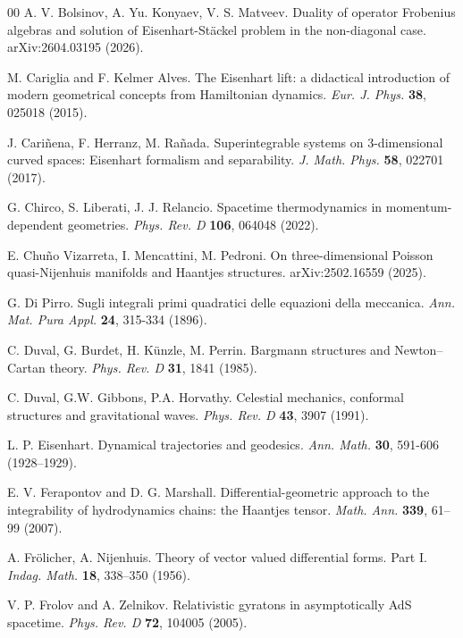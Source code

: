 \documentclass[10pt]{amsart}
\numberwithin{equation}{section}
\newcommand{\tbf}{\textbf}
\theoremstyle{definition}
\begin{document}
\begin{thebibliography}{00}
		 A. V. Bolsinov, A. Yu. Konyaev, V. S. Matveev. Duality of operator Frobenius algebras and solution of Eisenhart-St\"ackel problem in the non-diagonal case. arXiv:2604.03195 (2026).

		 M. Cariglia and F. Kelmer Alves. The Eisenhart lift: a didactical introduction of modern geometrical concepts from Hamiltonian dynamics. \textit{Eur. J. Phys.} \tbf{38}, 025018 (2015).
		
		 J. Cari{\~n}ena, F. Herranz, M. Ra{\~n}ada. Superintegrable systems on 3-dimensional curved spaces: Eisenhart formalism and separability.\textit{ J. Math. Phys.} \textbf{58}, 022701 (2017).
		
		 G. Chirco, S. Liberati, J. J. Relancio. Spacetime thermodynamics in momentum-dependent geometries. \textit{Phys. Rev. D} \tbf{106}, 064048 (2022).
		
		 E. Chuño Vizarreta, I. Mencattini, M. Pedroni. On three-dimensional Poisson quasi-Nijenhuis manifolds and Haantjes structures. arXiv:2502.16559 (2025).
		
		
		 G. Di Pirro. Sugli integrali primi quadratici delle equazioni della meccanica. \textit{Ann. Mat. Pura Appl.} \tbf{24}, 315-334 (1896).
		
		
		 C. Duval, G. Burdet, H. Künzle, M. Perrin. Bargmann structures and Newton–Cartan theory. \textit{Phys. Rev. D} \tbf{31}, 1841 (1985). 
		
		 C. Duval, G.W. Gibbons, P.A. Horvathy. Celestial mechanics, conformal structures and gravitational waves. \textit{Phys. Rev. D} \tbf{43}, 3907 (1991). 
		
		 L. P. Eisenhart. Dynamical trajectories and geodesics. \textit{Ann. Math.} \tbf{30}, 591-606 (1928--1929).
		
		
		 E. V. Ferapontov and D. G. Marshall. Differential-geometric approach to the integrability of hydrodynamics chains: the Haantjes tensor. \textit{Math. Ann.} \textbf{339}, 61--99 (2007).
		
		
		 A. Fr\"olicher, A. Nijenhuis. Theory of vector valued differential forms. Part I. \textit{Indag. Math.} \textbf{18}, 338--350 (1956).
		
		 V. P. Frolov and A. Zelnikov. Relativistic gyratons in asymptotically AdS spacetime. \textit{Phys. Rev. D} \textbf{72}, 104005 (2005).
		

\end{thebibliography}
\end{document}
